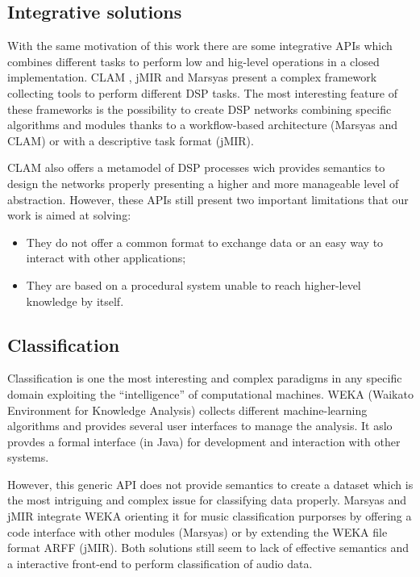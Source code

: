\documentclass[runningheads]{llncs}
\begin{document}
\subsection{Integrative solutions}\label{subsec:inte}

With the same motivation of this work there are some integrative APIs which combines different tasks to perform low and hig-level operations in a closed implementation. CLAM \cite{clam}, jMIR \cite{jmir} and Marsyas \cite{marsyas} present a complex framework collecting tools to perform different DSP tasks. The most interesting feature of these frameworks is the possibility to create DSP networks combining specific algorithms and modules thanks to a workflow-based architecture (Marsyas and CLAM) or with a descriptive task format (jMIR).

CLAM also offers a metamodel of DSP processes wich provides semantics to design the networks properly presenting a higher and more manageable level of abstraction. However, these APIs still present two important limitations that our work is aimed at solving:

\begin{itemize}
 \item They do not offer a common format to exchange data or an easy way to interact with other applications;
 \item They are based on a procedural system unable to reach higher-level knowledge by itself.
\end{itemize}

\subsection{Classification}\label{subsec:classif}

Classification is one the most interesting and complex paradigms in any specific domain exploiting the ``intelligence'' of computational machines. WEKA (Waikato Environment for Knowledge Analysis) \cite{weka} collects different machine-learning algorithms and provides several user interfaces to manage the analysis. It aslo provdes a formal interface (in Java) for development and interaction with other systems.

However, this generic API does not provide semantics to create a dataset which is the most intriguing and complex issue for classifying data properly. Marsyas and jMIR integrate WEKA orienting it for music classification purporses by offering a code interface with other modules (Marsyas) or by extending the WEKA file format ARFF (jMIR). Both solutions still seem to lack of effective semantics and a interactive front-end to perform classification of audio data.
\end{document}
